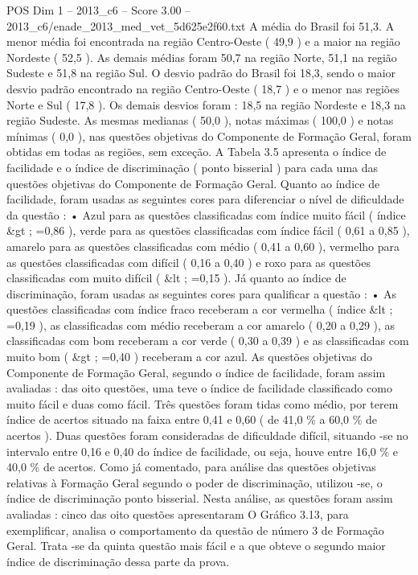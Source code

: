\begin{textsample}{POS Dim 1 – 2013\_c6 – Score 3.00 – 2013\_c6/enade\_2013\_med\_vet\_5d625e2f60.txt}
A média do Brasil foi 51,3.
A menor média foi encontrada na região Centro-Oeste ( 49,9 ) e a maior na região Nordeste ( 52,5 ).
As demais médias foram 50,7 na região Norte, 51,1 na região Sudeste e 51,8 na região Sul.
O desvio padrão do Brasil foi 18,3, sendo o maior desvio padrão encontrado na região Centro-Oeste ( 18,7 ) e o menor nas regiões Norte e Sul ( 17,8 ).
Os demais desvios foram : 18,5 na região Nordeste e 18,3 na região Sudeste.
As mesmas medianas ( 50,0 ), notas máximas ( 100,0 ) e notas mínimas ( 0,0 ), nas questões objetivas do Componente de Formação Geral, foram obtidas em todas as regiões, sem exceção.
A Tabela 3.5 apresenta o índice de facilidade e o índice de discriminação ( ponto bisserial ) para cada uma das questões objetivas do Componente de Formação Geral.
Quanto ao índice de facilidade, foram usadas as seguintes cores para diferenciar o nível de dificuldade da questão : • Azul para as questões classificadas com índice muito fácil ( índice \&gt ; =0,86 ), verde para as questões classificadas com índice fácil ( 0,61 a 0,85 ), amarelo para as questões classificadas com médio ( 0,41 a 0,60 ), vermelho para as questões classificadas com difícil ( 0,16 a 0,40 ) e roxo para as questões classificadas com muito difícil ( \&lt ; =0,15 ).
Já quanto ao índice de discriminação, foram usadas as seguintes cores para qualificar a questão : • As questões classificadas com índice fraco receberam a cor vermelha ( índice \&lt ; =0,19 ), as classificadas com médio receberam a cor amarelo ( 0,20 a 0,29 ), as classificadas com bom receberam a cor verde ( 0,30 a 0,39 ) e as classificadas com muito bom ( \&gt ; =0,40 ) receberam a cor azul.
As questões objetivas do Componente de Formação Geral, segundo o índice de facilidade, foram assim avaliadas : das oito questões, uma teve o índice de facilidade classificado como muito fácil e duas como fácil.
Três questões foram tidas como médio, por terem índice de acertos situado na faixa entre 0,41 e 0,60 ( de 41,0 \% a 60,0 \% de acertos ).
Duas questões foram consideradas de dificuldade difícil, situando -se no intervalo entre 0,16 e 0,40 do índice de facilidade, ou seja, houve entre 16,0 \% e 40,0 \% de acertos.
Como já comentado, para análise das questões objetivas relativas à Formação Geral segundo o poder de discriminação, utilizou -se, o índice de discriminação ponto bisserial.
Nesta análise, as questões foram assim avaliadas : cinco das oito questões apresentaram O Gráfico 3.13, para exemplificar, analisa o comportamento da questão de número 3 de Formação Geral.
Trata -se da quinta questão mais fácil e a que obteve o segundo maior índice de discriminação dessa parte da prova.

\end{textsample}
